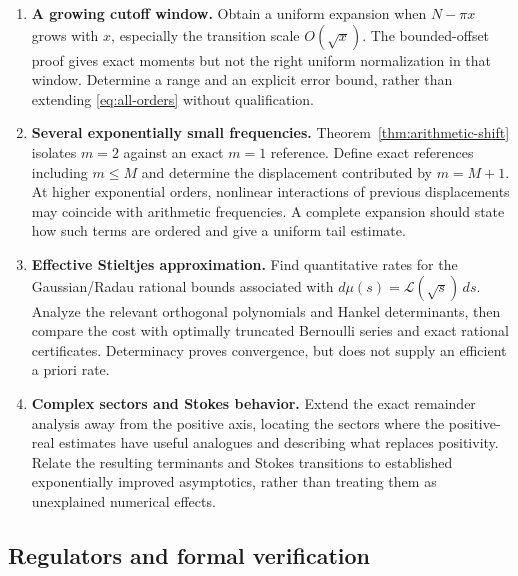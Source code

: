 \documentclass[11pt]{article}
\numberwithin{equation}{section}
\theoremstyle{definition}
\theoremstyle{remark}
\newcommand{\Lam}{\mathcal L}
\begin{document}
\begin{enumerate}[resume]
\item \textbf{A growing cutoff window.}
      Obtain a uniform expansion when $N-\pi x$ grows with $x$,
      especially the transition scale $O(\sqrt{x})$. The
      bounded-offset proof gives exact moments but not the right
      uniform normalization in that window. Determine a range
      and an explicit error bound, rather than extending
      \eqref{eq:all-orders} without qualification.

\item \textbf{Several exponentially small frequencies.}
      Theorem~\ref{thm:arithmetic-shift} isolates $m=2$ against an
      exact $m=1$ reference. Define exact references including
      $m\le M$ and determine the displacement contributed by
      $m=M+1$. At higher exponential orders, nonlinear
      interactions of previous displacements may coincide with
      arithmetic frequencies. A complete expansion should state
      how such terms are ordered and give a uniform tail estimate.

\item \textbf{Effective Stieltjes approximation.}
      Find quantitative rates for the Gaussian/Radau rational
      bounds associated with $d\mu(s)=\Lam(\sqrt s)\,ds$.
      Analyze the relevant orthogonal polynomials and Hankel
      determinants, then compare the cost with optimally
      truncated Bernoulli series and exact rational certificates.
      Determinacy proves convergence, but does not supply an
      efficient a priori rate.

\item \textbf{Complex sectors and Stokes behavior.}
      Extend the exact remainder analysis away from the positive
      axis, locating the sectors where the positive-real
      estimates have useful analogues and describing what
      replaces positivity. Relate the resulting terminants and
      Stokes transitions to established exponentially improved
      asymptotics, rather than treating them as unexplained
      numerical effects.
\end{enumerate}

\subsection{Regulators and formal verification}
\end{document}

